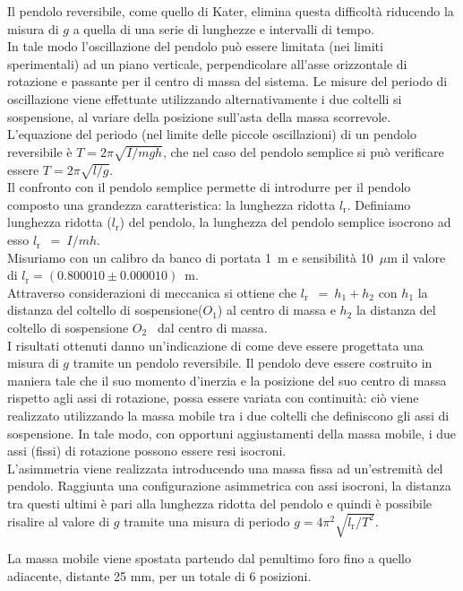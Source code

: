 \documentclass[italian, a4paper, 10pt, twocolumn]{../../style/lab_unige}
\newcommand{\Oi}{$O_1$}
\newcommand{\Oii}{$O_2$}
\newcommand{\lr}{$l_{\text{r}}$}
\newcommand{\LrVALUE}{$l_{\text{r}}=(0.800010\pm0.000010)$~m}
\begin{document}
    Il pendolo reversibile, come quello di Kater, elimina questa difficoltà riducendo la misura di $g$ a quella di una serie di lunghezze e intervalli di tempo.\\
    In tale modo l'oscillazione del pendolo può essere limitata (nei limiti sperimentali) ad un piano verticale, perpendicolare all'asse orizzontale di rotazione e passante per il centro di massa del sistema. Le misure del periodo di oscillazione viene effettuate utilizzando alternativamente i due coltelli si sospensione, al variare della posizione sull'asta della massa scorrevole.\\
    L’equazione del periodo (nel limite delle piccole oscillazioni) di un pendolo reversibile è $T = 2\pi\sqrt{I/mgh}$, che nel caso del pendolo semplice si può verificare essere $T = 2\pi\sqrt{l/g}$.\\
    Il confronto con il pendolo semplice permette di introdurre per il pendolo composto una grandezza caratteristica: la lunghezza ridotta \lr.
    Definiamo lunghezza ridotta (\lr) del pendolo, la lunghezza del pendolo semplice isocrono ad esso \lr~$=~I/mh$. \\
    Misuriamo con un calibro da banco di portata 1~m e sensibilità 10~$\mu$m il valore di \LrVALUE.\\ 
    Attraverso considerazioni di meccanica si ottiene che \lr~$=~h_1+h_2$ con $h_1$ la distanza del coltello di sospensione(\Oi) al centro di massa e $h_2$ la distanza del coltello di sospensione \Oii~ dal centro di massa.\\
    I risultati ottenuti danno un'indicazione di come deve essere progettata una misura di $g$ tramite un pendolo reversibile.
    Il pendolo deve essere costruito in maniera tale che il suo momento d'inerzia e la posizione del suo centro di massa rispetto agli assi di rotazione, possa essere variata con continuità: ciò viene realizzato utilizzando la massa mobile tra i due coltelli che definiscono gli assi di sospensione.
    In tale modo, con opportuni aggiustamenti della massa mobile, i due assi (fissi) di rotazione possono essere resi isocroni.\\
    L'asimmetria viene realizzata introducendo una massa fissa ad un'estremità del pendolo.
    Raggiunta una configurazione asimmetrica con assi isocroni, la distanza tra questi ultimi è pari alla lunghezza ridotta del pendolo e quindi è possibile risalire al valore di $g$ tramite una misura di periodo $g=4\pi^2\sqrt{l_{\text{r}}/T^2}$.

    La massa mobile viene spostata partendo dal penultimo foro fino a quello adiacente, distante 25 mm, per un totale di 6 posizioni.
\end{document}
